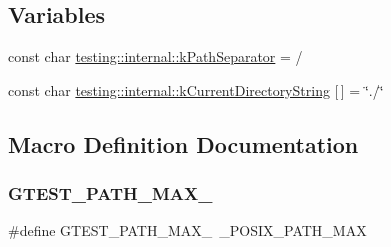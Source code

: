 \subsection*{Variables}
\begin{DoxyCompactItemize}
\item 
const char \mbox{\hyperlink{namespacetesting_1_1internal_afcd71adaa9d1e6df7b282a17fc48125c}{testing\+::internal\+::k\+Path\+Separator}} = \textquotesingle{}/\textquotesingle{}
\item 
const char \mbox{\hyperlink{namespacetesting_1_1internal_af0c1ffec2a97f6094e956d46c07f0b5d}{testing\+::internal\+::k\+Current\+Directory\+String}} \mbox{[}$\,$\mbox{]} = \char`\"{}./\char`\"{}
\end{DoxyCompactItemize}


\subsection{Macro Definition Documentation}
\mbox{\label{googletest-master_2googletest_2src_2gtest-filepath_8cc_ad9d445747785a9271a57cf1d392b89ad}} 
\subsubsection{\texorpdfstring{GTEST\_PATH\_MAX\_}{GTEST\_PATH\_MAX\_}}
{\footnotesize\ttfamily \#define G\+T\+E\+S\+T\+\_\+\+P\+A\+T\+H\+\_\+\+M\+A\+X\+\_\+~\+\_\+\+P\+O\+S\+I\+X\+\_\+\+P\+A\+T\+H\+\_\+\+M\+AX}

